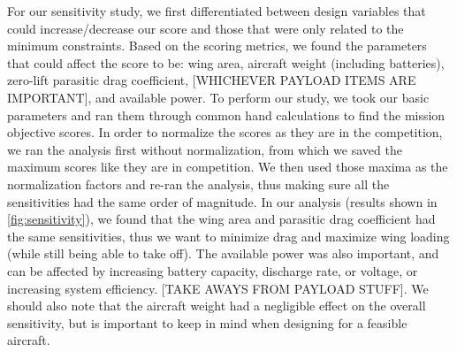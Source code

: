 For our sensitivity study, we first differentiated between design variables that could increase/decrease our score and those that were only related to the minimum constraints. Based on the scoring metrics, we found the parameters that could affect the score to be: wing area, aircraft weight (including batteries), zero-lift parasitic drag coefficient, {\color{BYUred}[WHICHEVER PAYLOAD ITEMS ARE IMPORTANT]}, and available power.  To perform our study, we took our basic parameters and ran them through common hand calculations to find the mission objective scores. In order to normalize the scores as they are in the competition, we ran the analysis first without normalization, from which we saved the maximum scores like they are in competition. We then used those maxima as the normalization factors and re-ran the analysis, thus making sure all the sensitivities had the same order of magnitude.  In our analysis (results shown in \cref{fig:sensitivity}), we found that the wing area and parasitic drag coefficient had the same sensitivities, thus we want to minimize drag and maximize wing loading (while still being able to take off).  The available power was also important, and can be affected by increasing battery capacity, discharge rate, or voltage, or increasing system efficiency. {\color{BYUred}[TAKE AWAYS FROM PAYLOAD STUFF]}. We should also note that the aircraft weight had a negligible effect on the overall sensitivity, but is important to keep in mind when designing for a feasible aircraft.